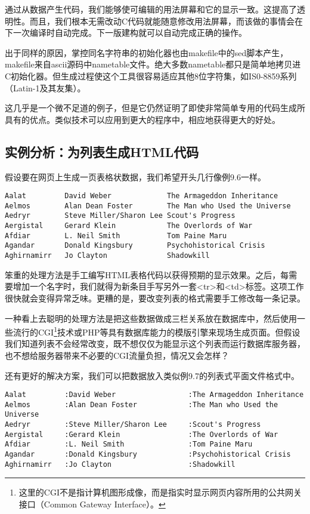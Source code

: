 \documentclass[12pt,oneside]{ctexbook}
\begin{document}
\begin{common-format}
通过从数据产生代码，我们能够使可编辑的用法屏幕和它的显示一致。这提高了透明性。而且，我们根本无需改动C代码就能随意修改用法屏幕，而该做的事情会在下一次编译时自动完成。下一版建构就可以自动完成正确的操作。

出于同样的原因，掌控同名字符串的初始化器也由makefile中的sed脚本产生，makefile来自ascii源码中nametable文件。绝大多数nametable都只是简单地拷贝进C初始化器。但生成过程使这个工具很容易适应其他8位字符集，如IS0-8859系列（Latin-1及其友集）。

这几乎是一个微不足道的例子，但是它仍然证明了即使非常简单专用的代码生成所具有的优点。类似技术可以应用到更大的程序中，相应地获得更大的好处。


\subsection{实例分析：为列表生成HTML代码}
假设要在网页上生成一页表格状数据，我们希望开头几行像例9.6一样。

\begin{Verbatim}[label=例9.6 明星列表要求的输出格式]
Aalat         David Weber             The Armageddon Inheritance
Aelmos        Alan Dean Foster        The Man who Used the Universe
Aedryr        Steve Miller/Sharon Lee Scout's Progress
Aergistal     Gerard Klein            The Overlords of War
Afdiar        L. Neil Smith           Tom Paine Maru
Agandar       Donald Kingsbury        Psychohistorical Crisis
Aghirnamirr   Jo Clayton              Shadowkill
\end{Verbatim}

笨重的处理方法是手工编写HTML表格代码以获得预期的显示效果。之后，每需要增加一个名字时，我们就得为新条目手写另外一套<tr>和<td>标签。这项工作很快就会变得异常乏味。更糟的是，要改变列表的格式需要手工修改每一条记录。

一种看上去聪明的处理方法是把这些数据做成三栏关系放在数据库中，然后使用一些流行的CGI\footnote{这里的CGI不是指计算机图形成像，而是指实时显示网页内容所用的公共网关接口（Common Gateway Interface）。}技术或PHP等具有数据库能力的模版引擎来现场生成页面。但假设我们知道列表不会经常改变，既不想仅仅为能显示这个列表而运行数据库服务器，也不想给服务器带来不必要的CGI流量负担，情况又会怎样？

还有更好的解决方案，我们可以把数据放入类似例9.7的列表式平面文件格式中。

\begin{Verbatim}[label=例9.7 明星表的主表]
Aalat         :David Weber                 :The Armageddon Inheritance
Aelmos        :Alan Dean Foster            :The Man who Used the Universe
Aedryr        :Steve Miller/Sharon Lee     :Scout's Progress
Aergistal     :Gerard Klein                :The Overlords of War
Afdiar        :L. Neil Smith               :Tom Paine Maru
Agandar       :Donald Kingsbury            :Psychohistorical Crisis
Aghirnamirr   :Jo Clayton                  :Shadowkill
\end{Verbatim}


\end{common-format}
\end{document}
